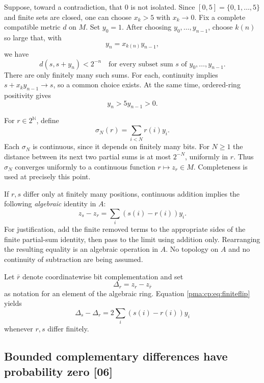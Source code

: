 \documentclass[11pt]{article}
\numberwithin{equation}{section}
\theoremstyle{definition}
\theoremstyle{remark}
\newcommand{\N}{\mathbb N}
\newcommand{\src}[1]{\textup{\textsf{\small[#1]}}}
\newcommand{\Cantor}{2^{\N}}
\begin{document}
Suppose, toward a contradiction, that $0$ is not isolated. Since
$[0,5]=\{0,1,\ldots,5\}$ and finite sets are closed, one can choose
$x_k>5$ with $x_k\to0$. Fix a complete compatible metric $d$ on $M$.
Set $y_0=1$. After choosing $y_0,\ldots,y_{n-1}$, choose $k(n)$ so
large that, with
\[
 y_n=x_{k(n)}y_{n-1},
\]
we have
\begin{equation}
 d(s,s+y_n)<2^{-n}
 \quad\text{for every subset sum }s
       \text{ of }y_0,\ldots,y_{n-1}.
 \label{pma:cp:eq:small-increments}
\end{equation}
There are only finitely many such sums. For each, continuity implies
$s+x_k y_{n-1}\to s$, so a common choice exists. At the same time,
ordered-ring positivity gives
\begin{equation}
 y_n>5y_{n-1}>0. \label{pma:cp:eq:growth}
\end{equation}

For $r\in\Cantor$, define
\[
 \sigma_N(r)=\sum_{i<N} r(i)y_i.
\]
Each $\sigma_N$ is continuous, since it depends on finitely many bits.
For $N\geq1$ the distance between its next two partial sums is at
most $2^{-N}$, uniformly in $r$. Thus $\sigma_N$ converges uniformly
to a continuous function $r\mapsto z_r\in M$. Completeness is used
at precisely this point.

If $r,s$ differ only at finitely many positions, continuous addition
implies the following \emph{algebraic} identity in $A$:
\begin{equation}
 z_s-z_r=\sum_i(s(i)-r(i))y_i.
 \label{pma:cp:eq:finiteflip}
\end{equation}
For justification, add the finite removed terms to the appropriate
sides of the finite partial-sum identity, then pass to the limit
using addition only. Rearranging the resulting equality is an
algebraic operation in $A$. No topology on $A$ and no continuity of
subtraction are being assumed.

Let $\bar r$ denote coordinatewise bit complementation and set
\[
 \Delta_r=z_r-z_{\bar r}
\]
as notation for an element of the algebraic ring. Equation
\eqref{pma:cp:eq:finiteflip} yields
\begin{equation}
 \Delta_s-\Delta_r=2\sum_i(s(i)-r(i))y_i
 \label{pma:cp:eq:deltachange}
\end{equation}
whenever $r,s$ differ finitely.

\subsection{Bounded complementary differences have probability zero \src{06}}
\end{document}
